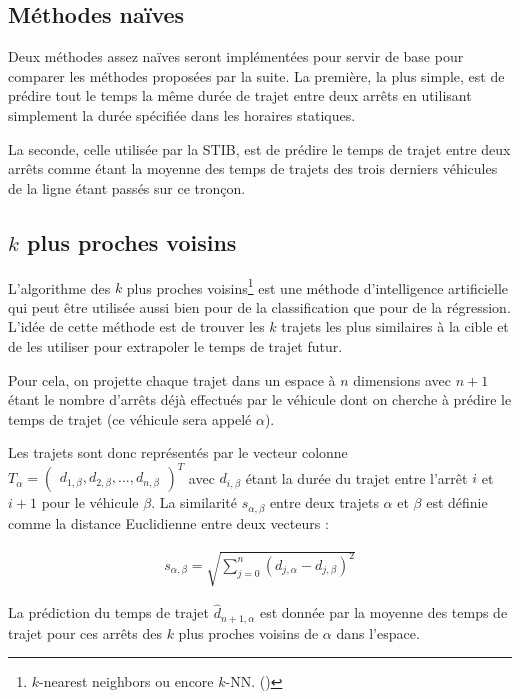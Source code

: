 \documentclass[letterpaper]{article}
\begin{document}
\subsection{Méthodes naïves}
Deux méthodes assez naïves seront implémentées pour servir de base pour comparer les méthodes proposées par la suite.
La première, la plus simple, est de prédire tout le temps la même durée de trajet entre deux arrêts en utilisant simplement la durée spécifiée dans les horaires statiques.

La seconde, celle utilisée par la STIB, est de prédire le temps de trajet entre deux arrêts comme étant la moyenne des temps de trajets des trois derniers véhicules de la ligne étant passés sur ce tronçon.

\subsection{$k$ plus proches voisins}

L'algorithme des $k$ plus proches voisins\footnote{$k$-nearest neighbors ou encore $k$-NN. (\cite{trevor2009elements})}
est une méthode d'intelligence artificielle qui peut être utilisée aussi bien pour de la classification que pour de la régression.
L'idée de cette méthode est de trouver les $k$ trajets les plus similaires à la cible et de les utiliser pour extrapoler le temps de trajet futur.

Pour cela, on projette chaque trajet dans un espace à $n$ dimensions avec $n+1$ étant le nombre d'arrêts déjà effectués par le véhicule dont on cherche à prédire le temps de trajet (ce véhicule sera appelé $\alpha$).

Les trajets sont donc représentés par le vecteur colonne
$T_{\alpha} = \begin{pmatrix}d_{1,\beta}, d_{2,\beta}, ..., d_{n,\beta}\end{pmatrix}^{T}$
avec $d_{i,\beta}$ étant la durée du trajet entre l'arrêt $i$ et $i+1$ pour le véhicule $\beta$.
La similarité $s_{\alpha,\beta}$ entre deux trajets $\alpha$ et $\beta$ est définie comme la distance Euclidienne entre deux vecteurs :

\begin{eqnarray}
s_{\alpha,\beta} = \sqrt{\sum_{j=0}^{n}(d_{j,\alpha} - d_{j,\beta})^2}
\end{eqnarray}

La prédiction du temps de trajet $\hat{d}_{n+1,\alpha}$ est donnée par la moyenne des temps de trajet pour ces arrêts des $k$ plus proches voisins de $\alpha$ dans l'espace.
\end{document}
